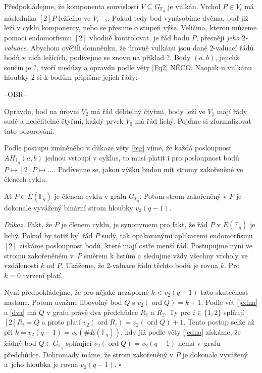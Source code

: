 \documentclass[12pt]{report}
\DeclareMathOperator{\ord}{ord}
\begin{document}
Předpokládejme, že komponenta souvislosti $V \subseteq G_{\mathbb{F}_q}$ je vulkán.  Vrchol $P \in V_i$ má následníka $[2]P$ ležícího ve $V_{i-1}$. Pokud tedy bod vynásobíme dvěma, buď již leží v cyklu komponenty, nebo se přesune o stupeň výše. Veličina, kterou můžeme pomocí endomorfismu $[2]$ vhodně kontrolovat, je řád bodu $P$, přesněji \textit{jeho $2$-valuace}. Abychom ověřili domněnku, že úrovně vulkánu jsou dané $2$-valuací řádů bodů v nich ležících, podívejme se znovu na příklad ?. Body $(a,b)$, jejichž součin je ?, tvoří medúzy a opravdu podle věty \ref{Fq2} NĚCO. Naopak u vulkánu hloubky $2$ si k bodům připišme jejich řády:

--OBR--

Opravdu, bod na úrovni $V_2$ má řád dělitelný čtyřmi, body leží ve $V_1$ mají řády sudé a nedělitelné čtyřmi, každý prvek $V_0$ má řád lichý. Pojďme si zformalizovat tato pozorování.

Podle postupu zmíněného v důkaze věty \ref{big} víme, že každá posloupnost $AH_{\mathbb{F}_q}(a,b)$ jednou vstoupí v cyklus, to  musí platit i pro posloupnost bodů $P \longmapsto [2] P \longmapsto \dots$. Podívejme se, jakou výšku budou mít stromy zakořeněné ve členech cyklu.   

\begin{veta}
Ať $P \in E(\mathbb{F}_q)$ je členem cyklu v grafu $G_{\mathbb{F}_q}$. Potom strom zakořeněný v $P$ je dokonale vyvážený binární strom hloubky $v_2 (q-1)$. 
\end{veta}

\noindent \textit{Důkaz.} Fakt, že $P$ je členem cyklu, je synonymem pro fakt, že řád $P$ v $E(\mathbb{F}_q)$ je lichý. Pokud by totiž byl řád $P$ sudý, tak opakovanými aplikacemi endomorfismu $[2]$ získáme posloupnost bodů, které mají ostře menší řád. Postupujme nyní ve stromu zakořeněném v~$P$ směrem k listům a sledujme vždy všechny vrcholy ve vzdálenosti $k$ od $P$. Ukážeme, že $2$-valuace řádu těchto bodů je rovna $k$. Pro $k=0$ tvrzení platí.

Nyní předpokládejme, že pro nějaké nezáporné $k < v_2 (q-1)$ tato skutečnost nastane. Potom uvažme libovolný bod $Q$ s $v_2 (\ord Q) = k+1$. Podle vět \ref{jedna} a \ref{dva} má $Q$  v grafu právě dva předchůdce $R_1$ a $R_2$. Ty pro $i \in \lbrace 1,2 \rbrace$ splňují $[2] R_i = Q$ a proto platí $v_2 (\ord R_i) = v_2 (\ord Q) + 1$. Tento postup selže až při $k=v_2(q-1) = v_2 ( \# E (\mathbb{F}_q))$, kdy již podle věty \ref{jedna} získáme, že žádný bod $Q \in G_{\mathbb{F}_q}$ splňující $v_2 (\ord Q) = v_2 (q-1)$ nemá v~grafu předchůdce. 
Dohromady máme, že strom zakořeněný v $P$ je dokonale vyvážený a~jeho hloubka je rovna  $v_2(q-1)$. \hfill $\square$\\ 
\end{document}
